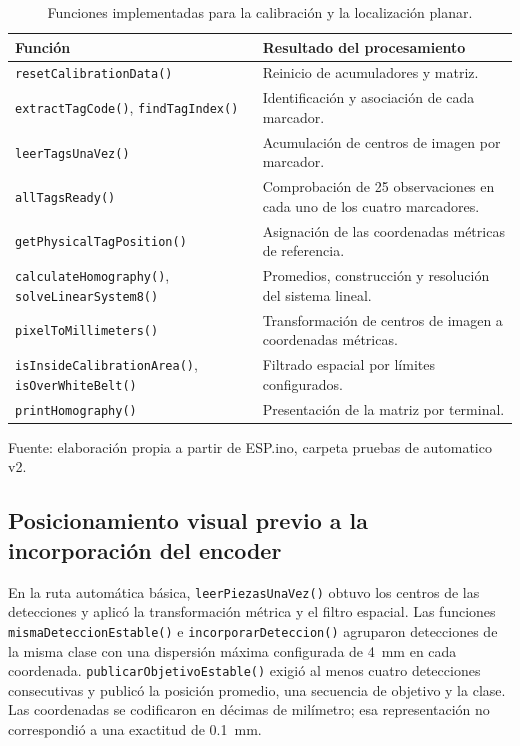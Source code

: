 \begin{table}[H]
    \centering\small
    \caption{Funciones implementadas para la calibración y la localización planar.}
    \label{tab:fase5_calibracion}
    \begin{tabular}{p{}p{}}
        \hline
        Función & Resultado del procesamiento \\
        \hline
        \texttt{resetCalibrationData()} & Reinicio de acumuladores y matriz. \\
        \texttt{extractTagCode()}, \texttt{findTagIndex()} & Identificación y asociación de cada marcador. \\
        \texttt{leerTagsUnaVez()} & Acumulación de centros de imagen por marcador. \\
        \texttt{allTagsReady()} & Comprobación de 25 observaciones en cada uno de los cuatro marcadores. \\
        \texttt{getPhysicalTagPosition()} & Asignación de las coordenadas métricas de referencia. \\
        \texttt{calculateHomography()}, \texttt{solveLinearSystem8()} & Promedios, construcción y resolución del sistema lineal. \\
        \texttt{pixelToMillimeters()} & Transformación de centros de imagen a coordenadas métricas. \\
        \texttt{isInsideCalibrationArea()}, \texttt{isOverWhiteBelt()} & Filtrado espacial por límites configurados. \\
        \texttt{printHomography()} & Presentación de la matriz por terminal. \\
        \hline
    \end{tabular}
    \par\small\raggedright Fuente: elaboración propia a partir de ESP.ino, carpeta pruebas de automatico v2.
\end{table}

\subsection{Posicionamiento visual previo a la incorporación del encoder}

En la ruta automática básica, \texttt{leerPiezasUnaVez()} obtuvo los centros de las detecciones y aplicó la transformación métrica y el filtro espacial. Las funciones \texttt{mismaDeteccionEstable()} e \texttt{incorporarDeteccion()} agruparon detecciones de la misma clase con una dispersión máxima configurada de 4~mm en cada coordenada. \texttt{publicarObjetivoEstable()} exigió al menos cuatro detecciones consecutivas y publicó la posición promedio, una secuencia de objetivo y la clase. Las coordenadas se codificaron en décimas de milímetro; esa representación no correspondió a una exactitud de 0.1~mm.

